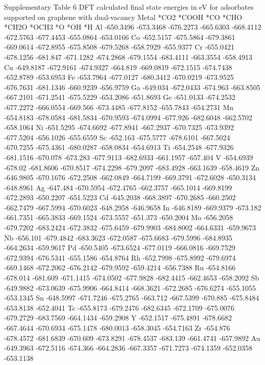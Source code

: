 Supplementary Table 6
DFT calculated final state energies in eV for adsorbates supported on graphene with dual-vacancy
Metal	*CO2	*COOH	*CO	*CHO	*CH2O	*OCH3	*O	*OH	*H
Al	-650.3496	-673.3468	-676.2273	-665.6303	-668.4112	-672.5763	-677.4453	-655.0864	-653.0166
Co	-652.5157	-675.5864	-679.3861	-669.0614	-672.8955	-675.8508	-679.5268	-658.7929	-655.9377
Cr	-655.0421	-678.1256	-681.847	-671.1282	-674.2868	-679.1554	-683.4111	-663.3554	-658.4913
Cu	-649.8187	-672.9161	-674.9327	-664.819	-669.0819	-672.1515	-674.7438	-652.8789	-653.6953
Fe	-653.7964	-677.0127	-680.3412	-670.0219	-673.9525	-676.7631	-681.1346	-660.9239	-656.9759
Ga	-649.034	-672.0433	-674.963	-663.8505	-667.2101	-671.2541	-675.5229	-653.2086	-651.8693
Ge	-651.0133	-674.2532	-677.2272	-666.0554	-669.566	-673.4485	-677.8152	-655.7843	-654.2731
Mn	-654.8183	-678.0584	-681.5834	-670.9593	-674.0994	-677.926	-682.6048	-662.5702	-658.1064
Ni	-651.5295	-674.6692	-677.8941	-667.2937	-670.7325	-673.9392	-677.5204	-656.1026	-655.6559
Sc	-652.163	-675.5777	-678.6101	-667.5024	-670.7255	-675.4361	-680.0287	-658.0834	-654.6913
Ti	-654.2548	-677.9326	-681.1516	-670.078	-673.283	-677.9113	-682.6933	-661.1957	-657.404
V	-654.6939	-678.02		-681.8606	-670.8517	-674.2298	-679.2097	-683.4928	-663.1639	-658.4619
Zn	-646.9805	-670.1676	-672.2508	-662.0849	-664.7199	-669.3791	-672.6028	-650.3134	-648.8961
Ag	-647.484	-670.5954	-672.4765	-662.3757	-665.1014	-669.8199	-672.2893	-650.2207	-651.5223
Cd	-645.2038	-668.3897	-670.2685	-660.2502	-662.7479	-667.5994	-670.6023	-648.2958	-646.9658
In	-646.8189	-669.9379	-673.182	-661.7351	-665.3833	-669.1524	-673.5557	-651.373	-650.2004
Mo	-656.2058	-679.7202	-683.2424	-672.3832	-675.6459	-679.9903	-684.8002	-664.6331	-659.9673
Nb	-656.101	-679.4842	-683.3623	-672.0587	-675.6683	-679.5996	-684.8935	-664.2634	-659.9617
Pd	-650.5405	-673.6524	-677.0119	-666.0816	-669.7529	-672.9394	-676.5341	-655.1586	-654.8764
Rh	-652.7998	-675.8992	-679.6974	-669.1468	-672.2062	-676.2142	-679.9592	-659.4214	-656.7388
Ru	-654.8166	-678.014	-681.609	-671.1415	-674.0502	-677.9828	-682.4415	-662.4653	-658.2092
Sb	-649.9882	-673.0639	-675.9906	-664.8414	-668.3621	-672.2685	-676.6274	-655.1055	-653.1345
Sn	-648.5997	-671.7246	-675.2765	-663.712	-667.5399	-670.885	-675.8484	-653.8138	-652.4041
Tc	-655.8173	-679.2476	-682.6345	-672.1709	-675.0076	-679.2729	-683.7569	-664.1434	-659.2908
Y	-652.1517	-675.4891	-678.6682	-667.4644	-670.6934	-675.1478	-680.0013	-658.3045	-654.7163
Zr	-654.876	-678.4572	-681.6839	-670.609	-673.8291	-678.4537	-683.139	-661.4741	-657.9892
Au	-649.3963	-672.5116	-674.366	-664.2836	-667.3357	-671.7273	-674.1359	-652.0358	-653.1138
